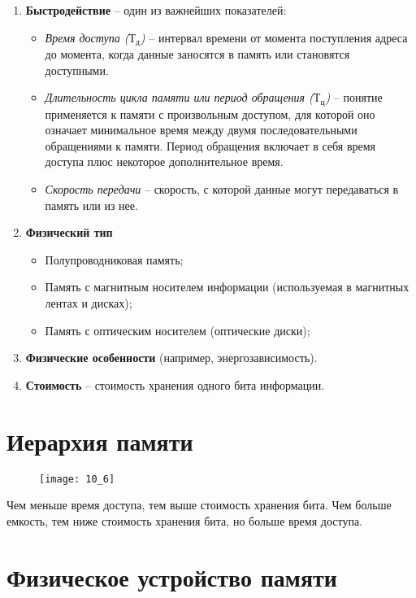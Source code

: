 \begin{enumerate}
  \item \textbf{Быстродействие} -- один из важнейших показателей:
  \begin{itemize}
    \item \emph{Время доступа ($\mbox{Т}_{\mbox{д}}$)} -- интервал времени от момента поступления адреса до момента, когда данные заносятся в память или становятся доступными.
    \item \emph{Длительность цикла памяти или период обращения ($\mbox{Т}_{\mbox{ц}}$)} -- понятие применяется к памяти с произвольным доступом, для которой оно означает минимальное время между двумя последовательными обращениями к памяти. Период обращения включает в себя время доступа плюс некоторое дополнительное время.
    \item \emph{Скорость передачи} -- скорость, с которой данные могут передаваться в память или из нее.
  \end{itemize}
  \item \textbf{Физический тип}
  \begin{itemize}
    \item Полупроводниковая память;
    \item Память с магнитным носителем информации (используемая в магнитных лентах и дисках);
    \item Память с оптическим носителем (оптические диски);
  \end{itemize}
  \item \textbf{Физические особенности} (например, энергозависимость).
  \item \textbf{Стоимость} -- стоимость хранения одного бита информации.
\end{enumerate}
\section{Иерархия памяти}
\begin{figure}[!h]
\texttt{[image: 10\_6]}
\end{figure}
Чем меньше время доступа, тем выше стоимость хранения бита. Чем больше емкость, тем ниже стоимость хранения бита, но больше время доступа.

\section{Физическое устройство памяти}
